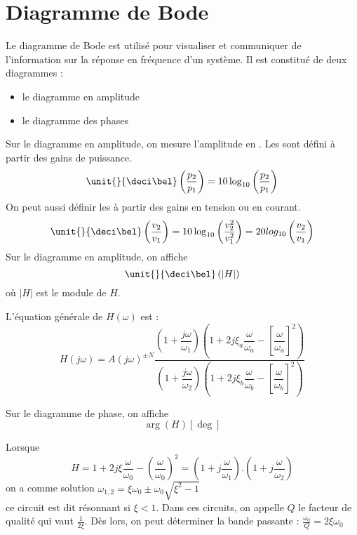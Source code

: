 \section{Diagramme de Bode}
Le diagramme de Bode est utilisé pour visualiser et communiquer de l'information sur la 
réponse en fréquence d'un système. Il est constitué de deux diagrammes :
\begin{itemize}
\item le diagramme en amplitude
\item le diagramme des phases
\end{itemize}
Sur le diagramme en amplitude, on mesure l'amplitude en \unit{}{\deci\bel}. Les \unit{}{\deci\bel} sont défini à partir des gains de puissance.
\begin{equation}
\unit{}{\deci\bel}\left(\dfrac{p_2}{p_1}\right) =10\log_{10}\left(\dfrac{p_2}{p_1}\right)
\end{equation}
On peut aussi définir les \unit{}{\deci\bel} à partir des gains en tension ou en courant.
\begin{equation}
\unit{}{\deci\bel}\left(\dfrac{v_2}{v_1}\right) =10\log_{10}\left(\dfrac{v_2^2}{v_1^2}\right)=20log_{10}\left(\dfrac{v_2}{v_1}\right)
\end{equation}
Sur le diagramme en amplitude, on affiche 
\begin{equation}
\unit{}{\deci\bel}\left(|H|\right)
\end{equation}
où $|H|$ est le module de $H$.

L'équation générale de $H(\omega)$ est : 
\begin{equation}
H(j\omega)=A(j\omega)^{\pm N}\dfrac{\left(1+\dfrac{j\omega}{\omega_1}\right)\left(1+2j\xi_a\dfrac{\omega}{\omega_a}-\left[\dfrac{\omega}{\omega_a}\right]^2\right)}{\left(1+\dfrac{j\omega}{\omega_2}\right)\left(1+2j\xi_b\dfrac{\omega}{\omega_b}-\left[\dfrac{\omega}{\omega_b}\right]^2\right)}
\end{equation}

Sur le diagramme de phase, on affiche
\begin{equation}
\arg (H) \unit{}{[\deg]}
\end{equation}

Lorsque $$H=1+2j\xi  \dfrac{\omega}{\omega_0}-\left(\dfrac{\omega}{\omega_0}\right)^2=\left(1+j\dfrac{\omega}{\omega_1}\right).\left(1+j\dfrac{\omega}{\omega_2}\right)$$ on a comme solution $\omega_{1,2}=\xi\omega_0 \pm \omega_0\sqrt{\xi^2-1}$
$$  $$ ce circuit est dit résonnant si $\xi<1$. Dans ces circuits, on appelle $Q$ le facteur de qualité qui vaut $\frac{1}{2\xi}$. Dès lors, on peut déterminer la bande passante : $\frac{\omega_0}{Q}=2\xi\omega_0$
\newpage
